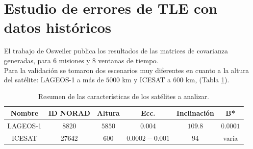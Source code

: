 \begin{table}[!h]
\caption{Resultados del Systems Tool Kit (STK) propagando el mismo TLE que ARxCODE.}
\centering
{}
\end{table}



\section{Estudio de errores de TLE con datos hist\'oricos}

El trabajo de Osweiler publica los resultados de las matrices de covarianza generadas, para 6 misiones y 8 ventanas de tiempo.\\

Para la validaci\'on se tomaron dos escenarios muy diferentes en cuanto a la altura del sat\'elite: LAGEOS-1 a m\'as de $5000$ km y ICESAT a $600 $ km, (Tabla \ref{tab:satescenarios}).\\


\begin{table}[!h]
\caption[Sat\'elites de Estudio]{Resumen de las caracter\'isticas de los sat\'elites a analizar.}

      \begin{tabular}{cccccc}
      \hline
      Nombre & ID NORAD & Altura & Ecc. & Inclinaci\'on & B* \\
      \hline
      LAGEOS-1 & 8820 & $5850$ & $0.004$ & $109.8$ & $0.0001$ \\
      ICESAT & 27642 & $600$ & $0.0002 - 0.001$ & $94$ & var\'ia \\
      \hline
      \end{tabular}
    \label{tab:satescenarios}
\end{table}

